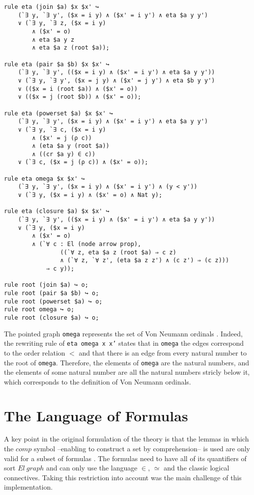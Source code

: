\documentclass[submission,copyright,creativecommons]{eptcs}
\begin{document}
\begin{lstlisting}
rule eta (join $a) $x $x' ↪ 
	(`∃ y, `∃ y', ($x = i y) ∧ ($x' = i y') ∧ eta $a y y')
    ∨ (`∃ y, `∃ z, ($x = i y) 
    	∧ ($x' = o) 
    	∧ eta $a y z 
    	∧ eta $a z (root $a));

rule eta (pair $a $b) $x $x' ↪ 
	(`∃ y, `∃ y', (($x = i y) ∧ ($x' = i y') ∧ eta $a y y'))
    ∨ (`∃ y, `∃ y', ($x = j y) ∧ ($x' = j y') ∧ eta $b y y')
    ∨ (($x = i (root $a)) ∧ ($x' = o))
    ∨ (($x = j (root $b)) ∧ ($x' = o));

rule eta (powerset $a) $x $x' ↪ 
	(`∃ y, `∃ y', ($x = i y) ∧ ($x' = i y') ∧ eta $a y y')
    ∨ (`∃ y, `∃ c, ($x = i y) 
    	∧ ($x' = j (ρ c)) 
    	∧ (eta $a y (root $a)) 
    	∧ ((cr $a y) ∈ c))
    ∨ (`∃ c, ($x = j (ρ c)) ∧ ($x' = o));

rule eta omega $x $x' ↪ 
	(`∃ y, `∃ y', ($x = i y) ∧ ($x' = i y') ∧ (y < y'))
    ∨ (`∃ y, ($x = i y) ∧ ($x' = o) ∧ Nat y);

rule eta (closure $a) $x $x' ↪ 
	(`∃ y, `∃ y', (($x = i y) ∧ ($x' = i y') ∧ eta $a y y'))
	∨ (`∃ y, ($x = i y) 
        ∧ ($x' = o)
        ∧ (`∀ c : El (node arrow prop), 
                ((`∀ z, eta $a z (root $a) ⇒ c z)
                ∧ (`∀ z, `∀ z', (eta $a z z') ∧ (c z') ⇒ (c z)))
            ⇒ c y));
            
rule root (join $a) ↪ o;
rule root (pair $a $b) ↪ o;
rule root (powerset $a) ↪ o;
rule root omega ↪ o;
rule root (closure $a) ↪ o;
\end{lstlisting}

The pointed graph \texttt{omega} represents the set of Von Neumann ordinals \cite[see Table 2]{zermodulo}. Indeed, the rewriting rule of \texttt{eta omega x x'} states that in \texttt{omega} the edges correspond to the order relation $<$ and that there is an edge from every natural number to the root of \texttt{omega}. Therefore, the elements of \texttt{omega} are the natural numbers, and the elements of some natural number are all the natural numbers stricly below it, which corresponds to the definition of Von Neumann ordinals.


\section{The Language of Formulas}

A key point in the original formulation of the theory is that the lemmas in which the $comp$ symbol --enabling to construct a set by comprehension-- is used are only valid for a subset of formulas \cite[see Table 5]{zermodulo}. The formulas need to have all of its quantifiers of sort $El~graph$ and can only use the language $\in$, $\simeq$ and the classic logical connectives. Taking this restriction into account was the main challenge of this implementation.
\end{document}
